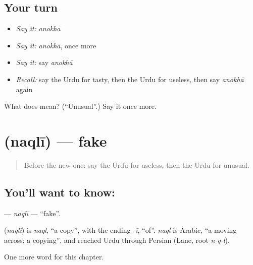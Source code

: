 \subsection*{Your turn}
\begin{itemize}
\raggedright
  \item \emph{Say it:} \emph{anokhā}
  \item \emph{Say it:} \emph{anokhā}, once more
  \item \emph{Say it:} say \emph{anokhā}
  \item \emph{Recall:} say the Urdu for tasty, then the Urdu for useless, then say \emph{anokhā} again
\end{itemize}

\begin{tcolorbox}[breakable,colback=teal!4,colframe=teal!35!black,title={Before you move on}]
What does  mean? (\textquotedblleft{}Unusual\textquotedblright{}.) Say it once more.
\end{tcolorbox}
\section[\texorpdfstring{\ur{نقلی} (naqlī)}{نقلی (naqlī)}]{ (naqlī) — fake}

\label{lesson:UR-C222-naqli}



\begin{quote}
Before the new one: say the Urdu for useless, then the Urdu for unusual.
\end{quote}

\subsection*{You'll want to know: }
\textbf{} — \emph{naqlī} — \textquotedblleft{}fake\textquotedblright{}.

\begin{cousinweb}
\textbf{} (\emph{naqlī}) is \emph{naql}, \textquotedblleft{}a copy\textquotedblright{}, with the ending \emph{-ī}, \textquotedblleft{}of\textquotedblright{}. \emph{naql} is Arabic, \textquotedblleft{}a moving across; a copying\textquotedblright{}, and reached Urdu through Persian (Lane, root \emph{n-q-l}).
\end{cousinweb}

\begin{grammarlens}[title={What you've built}]
One more word for this chapter.
\end{grammarlens}

